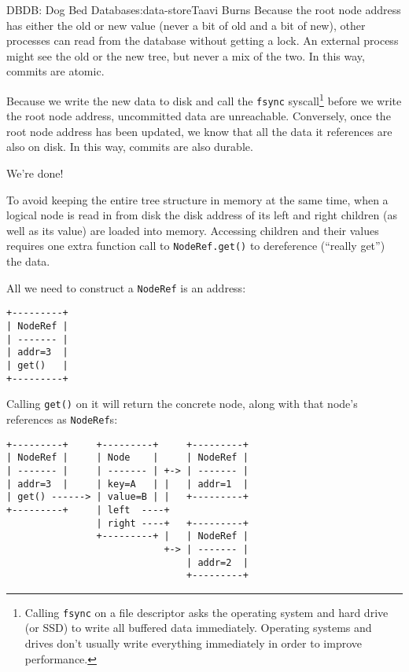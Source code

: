 \begin{aosachapter}{DBDB: Dog Bed Database}{s:data-store}{Taavi Burns}
Because the root node address has either the old or new value (never a
bit of old and a bit of new), other processes can read from the database
without getting a lock. An external process might see the old or the new
tree, but never a mix of the two. In this way, commits are atomic.

Because we write the new data to disk and call the \texttt{fsync}
syscall\footnote{Calling \texttt{fsync} on a file descriptor asks the
  operating system and hard drive (or SSD) to write all buffered data
  immediately. Operating systems and drives don't usually write
  everything immediately in order to improve performance.} before we
write the root node address, uncommitted data are unreachable.
Conversely, once the root node address has been updated, we know that
all the data it references are also on disk. In this way, commits are
also durable.

We're done!

\label{how-noderefs-save-memory}

To avoid keeping the entire tree structure in memory at the same time,
when a logical node is read in from disk the disk address of its left
and right children (as well as its value) are loaded into memory.
Accessing children and their values requires one extra function call to
\texttt{NodeRef.get()} to dereference (``really get'') the data.

All we need to construct a \texttt{NodeRef} is an address:

\begin{verbatim}
+---------+
| NodeRef |
| ------- |
| addr=3  |
| get()   |
+---------+
\end{verbatim}

Calling \texttt{get()} on it will return the concrete node, along with
that node's references as \texttt{NodeRef}s:

\begin{verbatim}
+---------+     +---------+     +---------+
| NodeRef |     | Node    |     | NodeRef |
| ------- |     | ------- | +-> | ------- |
| addr=3  |     | key=A   | |   | addr=1  |
| get() ------> | value=B | |   +---------+
+---------+     | left  ----+
                | right ----+   +---------+
                +---------+ |   | NodeRef |
                            +-> | ------- |
                                | addr=2  |
                                +---------+
\end{verbatim}


\end{aosachapter}

